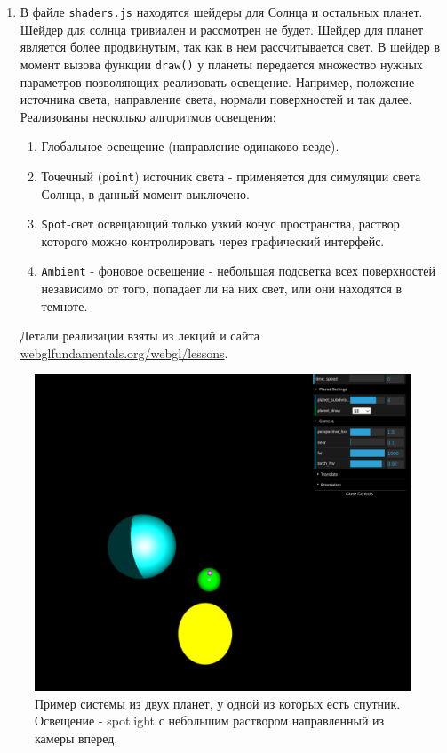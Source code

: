 \documentclass{bmstu}
\begin{document}
\begin{enumerate}
		\item В файле \verb|shaders.js| находятся шейдеры для Солнца и остальных планет. Шейдер для солнца тривиален и рассмотрен не будет. Шейдер для планет является более продвинутым, так как в нем рассчитывается свет. В шейдер в момент вызова функции \verb|draw()| у планеты передается множество нужных параметров позволяющих реализовать освещение. Например, положение источника света, направление света, нормали поверхностей и так далее. Реализованы несколько алгоритмов освещения:
		\begin{enumerate}
			\item Глобальное освещение (направление одинаково везде). 
			\item Точечный (\verb|point|) источник света - применяется для симуляции света Солнца, в данный момент выключено. 
			\item\verb|Spot|-свет освещающий только узкий конус пространства, раствор которого можно контролировать через графический интерфейс.
			\item\verb|Ambient| - фоновое освещение - небольшая подсветка всех поверхностей независимо от того, попадает ли на них свет, или они находятся в темноте.
		\end{enumerate}
		Детали реализации взяты из лекций и сайта \url{webglfundamentals.org/webgl/lessons}.
		
	\end{enumerate}
	
	\begin{figure}
		\centering
		\includegraphics[width=\linewidth]{screenshot001}
		\caption{Пример системы из двух планет, у одной из которых есть спутник. Освещение - spotlight с небольшим раствором направленный из камеры вперед.}
		\label{fig:screenshot001}
	\end{figure}
	
\end{document}
